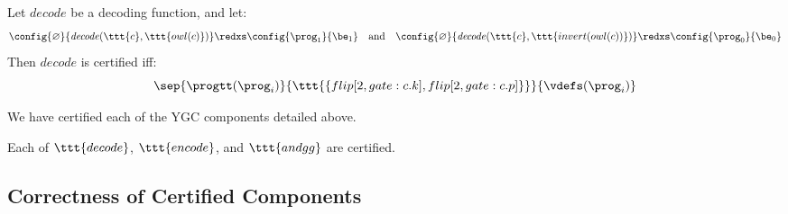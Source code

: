 \begin{definition}
  Let $\mathit{decode}$ be a decoding function, and let:
  $$
  \config{\varnothing}{\mathit{decode}(\ttt{c}, \ttt{owl(c)})}
  \redxs \config{\prog_1}{\be_1}
  \quad \text{and} \quad
  \config{\varnothing}{\mathit{decode}(\ttt{c}, \ttt{invert(owl(c))})}
  \redxs \config{\prog_0}{\be_0}
  $$
  Then $\mathit{decode}$ is certified iff:
  $$
  \sep{\progtt(\prog_i)}{\ttt{\{flip[2,gate:c.k],flip[2,gate:c.p]\}}}{\vdefs(\prog_i)}
  $$
\end{definition}
We have certified each of the YGC components detailed above. 
\begin{lemma}
  \label{lemma-certification}
  Each of $\ttt{decode}$, $\ttt{encode}$, and $\ttt{andgg}$ are certified.
\end{lemma}

\subsection{Correctness of Certified Components}
\label{section-composition-metatheory}

